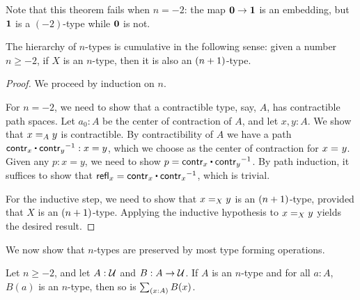 Note that this theorem fails when $n=-2$: the map $\emptyt \to \unit$ is an embedding, but $\unit$ is a $(-2)$-type while $\emptyt$ is not.

\begin{thm}\label{thm:hlevel-cumulative}
 The hierarchy of $n$-types is cumulative in the following sense:
   given a number $n \geq -2$, if $X$ is an $n$-type, then it is also an $\nplusone$-type.
\end{thm}

\begin{proof}
 We proceed by induction on $n$.

 For $n = -2$, we need to show that a contractible type, say, $A$, has contractible path spaces.
       Let $a_0: A$ be the center of contraction of $A$, and let $x, y : A$. We show that $\id[A]{x}{y}$
       is contractible.
       By contractibility of $A$ we have a path $\contr_x \ct \opp{\contr_y} : x = y$, which we choose as
       the center of contraction for $\id{x}{y}$.
       Given any $p : x = y$, we need to show $p = \contr_x \ct \opp{\contr_y}$.
           By path induction, it suffices to show that
        $\refl{x} = \contr_x \ct \opp{\contr_x}$, which is trivial.

 For the inductive step, we need to show that $\id[X]{x}{y}$ is an $\nplusone$-type, provided
          that $X$ is an $\nplusone$-type. Applying the inductive hypothesis to $\id[X]{x}{y}$
         yields the desired result.
\end{proof}


We now show that $n$-types are preserved by most type forming operations.

\begin{thm}\label{thm:ntypes-sigma}
 Let $n \geq -2$, and let $A : \type$ and $B : A \to \type$.
 If $A$ is an $n$-type and for all $a : A$, $B(a)$ is an $n$-type, then so is $\sm{x : A} B(x)$.
\end{thm}

